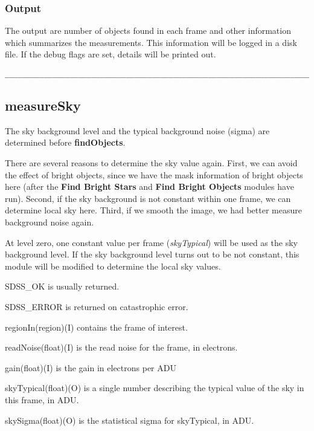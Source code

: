 \subsubsection{Output}           

The output are number of objects found in each frame and other information 
which summarizes the measurements.
This information will be logged in a disk file. If the 
debug flags are set, details will be printed out. 

\begin{verbatim}
__________________________________________________________________________
\end{verbatim}


\subsection {measureSky}

The sky background level and the typical background noise (sigma) are 
determined before {\bf findObjects}. 

There are several reasons to determine the sky value 
again. First, we can avoid the effect of bright objects,
since we have the mask information of bright objects here (after
the {\bf Find Bright Stars} and {\bf Find Bright Objects}
modules have run). 
Second, 
if the sky background is not constant within one frame, we can
determine local sky here. 
Third, if we smooth the image, we
had better measure background noise again.

At level zero, one constant value 
per frame ({\it skyTypical}) will be used as the sky background level.
If the sky background level turns out to be not constant, this
module will be modified to determine the local sky values. 

\begin{description}
  \item{\quad SDSS\_OK} is usually returned.
  \item{\quad SDSS\_ERROR} is returned on catastrophic error.
\end{description}

\begin{arguments}
\item{\quad regionIn}(region)(I) contains the frame of interest.
\item{\quad readNoise}(float)(I) is the read noise for the frame, in electrons.
\item{\quad gain}(float)(I) is the gain in electrons per ADU
\item{\quad skyTypical}(float)(O) is a single number describing the typical 
             value of the sky in this frame, in ADU.
\item{\quad skySigma}(float)(O) is the statistical sigma for skyTypical, in ADU.
\end{arguments}

